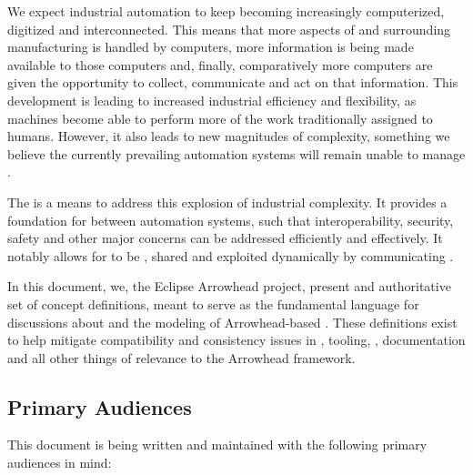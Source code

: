 %
%

We expect industrial automation to keep becoming increasingly computerized, digitized and interconnected.
This means that more aspects of and surrounding manufacturing is handled by computers, more information is being made available to those computers and, finally, comparatively more computers are given the opportunity to collect, communicate and act on that information.
This development is leading to increased industrial efficiency and flexibility, as machines become able to perform more of the work traditionally assigned to humans.
However, it also leads to new magnitudes of complexity, something we believe the currently prevailing automation systems will remain unable to manage \cite{delsing2017iot}.

The  is a means to address this explosion of industrial complexity.
It provides a foundation for  \cite{mackenzie2006reference} between automation systems, such that interoperability, security, safety and other major concerns can be addressed efficiently and effectively.
It notably allows for   to be , shared and exploited dynamically by communicating .

In this document, we, the Eclipse Arrowhead project, present and authoritative set of concept definitions, meant to serve as the fundamental language for discussions about and the modeling of Arrowhead-based .
These definitions exist to help mitigate compatibility and consistency issues in , tooling, , documentation and all other things of relevance to the Arrowhead framework.

\subsection{Primary Audiences}
\label{sec:introduction:audiences}

This document is being written and maintained with the following primary audiences in mind:

